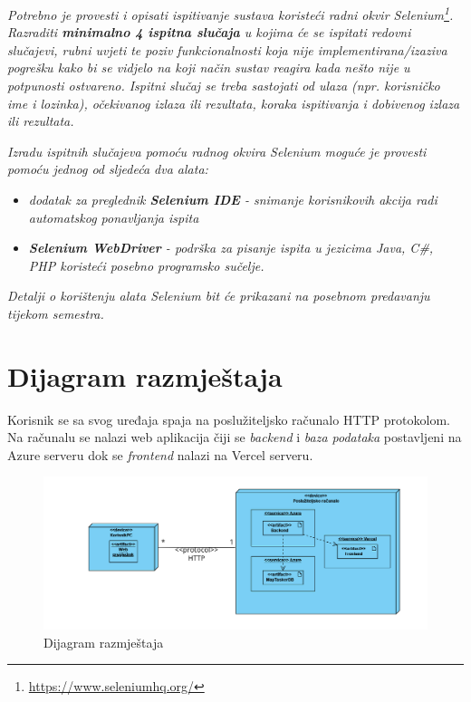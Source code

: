 	 \textit{Potrebno je provesti i opisati ispitivanje sustava koristeći radni okvir Selenium\footnote{\url{https://www.seleniumhq.org/}}. Razraditi \textbf{minimalno 4 ispitna slučaja} u kojima će se ispitati redovni slučajevi, rubni uvjeti te poziv funkcionalnosti koja nije implementirana/izaziva pogrešku kako bi se vidjelo na koji način sustav reagira kada nešto nije u potpunosti ostvareno. Ispitni slučaj se treba sastojati od ulaza (npr. korisničko ime i lozinka), očekivanog izlaza ili rezultata, koraka ispitivanja i dobivenog izlaza ili rezultata.\\ }
	 
	 \textit{Izradu ispitnih slučajeva pomoću radnog okvira Selenium moguće je provesti pomoću jednog od sljedeća dva alata:}
	 \begin{itemize}
		 \item \textit{dodatak za preglednik \textbf{Selenium IDE} - snimanje korisnikovih akcija radi automatskog ponavljanja ispita	}
		 \item \textit{\textbf{Selenium WebDriver} - podrška za pisanje ispita u jezicima Java, C\#, PHP koristeći posebno programsko sučelje.}
	 \end{itemize}
	 \textit{Detalji o korištenju alata Selenium bit će prikazani na posebnom predavanju tijekom semestra.}
	
	\eject 


\section{Dijagram razmještaja}

	Korisnik se sa svog uređaja spaja na poslužiteljsko računalo HTTP protokolom. Na računalu se nalazi web aplikacija čiji se \textit{backend} i \textit{baza podataka} postavljeni na Azure serveru dok se \textit{frontend} nalazi na Vercel serveru.

	
\begin{figure}[H]
			\includegraphics[scale=0.55]{dijagrami/DijagramRazm.png} %
			\centering
			\caption{Dijagram razmještaja}
			\label{fig:promjene}
	\end{figure}


